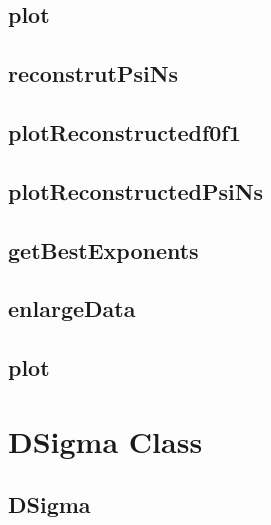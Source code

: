 \documentclass{book}
\begin{document}
\section{plot}

\section{reconstrutPsiNs}

\section{plotReconstructedf0f1}

\section{plotReconstructedPsiNs}

\section{getBestExponents}

\section{enlargeData}

\section{plot}

\chapter{DSigma Class}

\section{DSigma}
\end{document}
